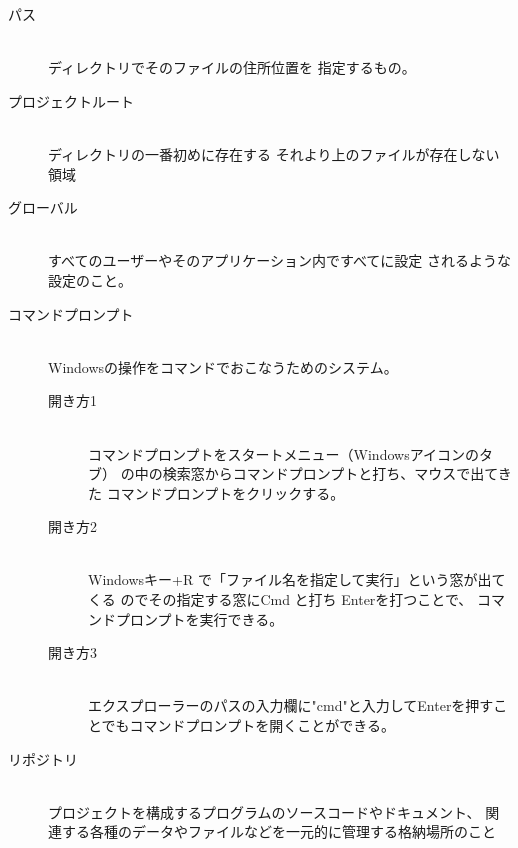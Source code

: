 \documentclass[titlepage]{ltjsarticle}
\begin{document}
\begin{description}
  \item [パス] ~\\
    ディレクトリでそのファイルの住所位置を
    指定するもの。
  \item [プロジェクトルート] ~\\
    ディレクトリの一番初めに存在する
    それより上のファイルが存在しない領域
  \item [グローバル] ~\\
    すべてのユーザーやそのアプリケーション内ですべてに設定
    されるような設定のこと。
  \item [コマンドプロンプト] ~\\
    Windowsの操作をコマンドでおこなうためのシステム。
    \begin{description}
      \item[開き方1] ~\\
      コマンドプロンプトをスタートメニュー（Windowsアイコンのタブ）
      の中の検索窓からコマンドプロンプトと打ち、マウスで出てきた
      コマンドプロンプトをクリックする。
      \item[開き方2] ~\\
      Windowsキー+R で「ファイル名を指定して実行」という窓が出てくる
      のでその指定する窓にCmd と打ち Enterを打つことで、
      コマンドプロンプトを実行できる。
      \item[開き方3]~\\
      エクスプローラーのパスの入力欄に"cmd"と入力してEnterを押すことでもコマンドプロンプトを開くことができる。
    \end{description}

  \item [リポジトリ] ~\\
    プロジェクトを構成するプログラムのソースコードやドキュメント、
    関連する各種のデータやファイルなどを一元的に管理する格納場所のこと
\end{description}
\end{document}
